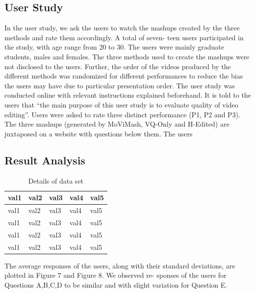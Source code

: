 \documentclass{sig-alternate}
\begin{document}
\subsection{User Study}
 In the user study, we ask the users to watch the mashups created
by the three methods and rate them accordingly. A total of seven-
teen users participated in the study, with age range from 20 to 30.
The users were mainly graduate students, males and females. The
three methods used to create the mashups were not disclosed to the
users. Further, the order of the videos produced by the different
methods was randomized for different performances to reduce the
bias the users may have due to particular presentation order.
The user study was conducted online with relevant instructions
explained beforehand. It is told to the users that “the main purpose
of this user study is to evaluate quality of video editing”. Users
were asked to rate three distinct performance (P1, P2 and P3). The
three mashups (generated by MoViMash, VQ-Only and H-Edited)
are juxtaposed on a website with questions below them. The users

\subsection{Result Analysis}
\begin{table}
\centering
\caption{ Details of data set }
\begin{tabular}{p{1.2cm}|p{1.2cm}|p{1.2cm}|p{1.2cm}|l} \hline
val1&val2&val3&val4 &val5\\ \hline
val1&val2&val3&val4 &val5\\ \hline
val1&val2&val3&val4 &val5\\ \hline
val1&val2&val3&val4 &val5\\ \hline
val1&val2&val3&val4 &val5\\ \hline
\end{tabular}
\end{table}

The average responses of the users, along with their standard
deviations, are plotted in Figure 7 and Figure 8. We observed re-
sponses of the users for Questions A,B,C,D to be similar and with
slight variation for Question E.
\end{document}

